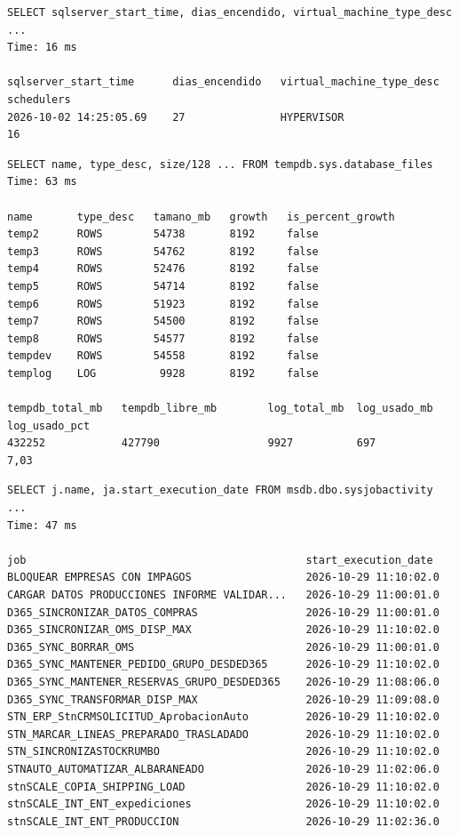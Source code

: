\documentclass[11pt,a4paper]{article}
\begin{document}
\begin{lstlisting}[style=salida]
SELECT sqlserver_start_time, dias_encendido, virtual_machine_type_desc ...
Time: 16 ms

sqlserver_start_time      dias_encendido   virtual_machine_type_desc   schedulers
2026-10-02 14:25:05.69    27               HYPERVISOR                  16
\end{lstlisting}

\begin{lstlisting}[style=salida]
SELECT name, type_desc, size/128 ... FROM tempdb.sys.database_files
Time: 63 ms

name       type_desc   tamano_mb   growth   is_percent_growth
temp2      ROWS        54738       8192     false
temp3      ROWS        54762       8192     false
temp4      ROWS        52476       8192     false
temp5      ROWS        54714       8192     false
temp6      ROWS        51923       8192     false
temp7      ROWS        54500       8192     false
temp8      ROWS        54577       8192     false
tempdev    ROWS        54558       8192     false
templog    LOG          9928       8192     false

tempdb_total_mb   tempdb_libre_mb        log_total_mb  log_usado_mb  log_usado_pct
432252            427790                 9927          697           7,03
\end{lstlisting}

\begin{lstlisting}[style=salida]
SELECT j.name, ja.start_execution_date FROM msdb.dbo.sysjobactivity ...
Time: 47 ms

job                                            start_execution_date
BLOQUEAR EMPRESAS CON IMPAGOS                  2026-10-29 11:10:02.0
CARGAR DATOS PRODUCCIONES INFORME VALIDAR...   2026-10-29 11:00:01.0
D365_SINCRONIZAR_DATOS_COMPRAS                 2026-10-29 11:00:01.0
D365_SINCRONIZAR_OMS_DISP_MAX                  2026-10-29 11:10:02.0
D365_SYNC_BORRAR_OMS                           2026-10-29 11:00:01.0
D365_SYNC_MANTENER_PEDIDO_GRUPO_DESDED365      2026-10-29 11:10:02.0
D365_SYNC_MANTENER_RESERVAS_GRUPO_DESDED365    2026-10-29 11:08:06.0
D365_SYNC_TRANSFORMAR_DISP_MAX                 2026-10-29 11:09:08.0
STN_ERP_StnCRMSOLICITUD_AprobacionAuto         2026-10-29 11:10:02.0
STN_MARCAR_LINEAS_PREPARADO_TRASLADADO         2026-10-29 11:10:02.0
STN_SINCRONIZASTOCKRUMBO                       2026-10-29 11:10:02.0
STNAUTO_AUTOMATIZAR_ALBARANEADO                2026-10-29 11:02:06.0
stnSCALE_COPIA_SHIPPING_LOAD                   2026-10-29 11:10:02.0
stnSCALE_INT_ENT_expediciones                  2026-10-29 11:10:02.0
stnSCALE_INT_ENT_PRODUCCION                    2026-10-29 11:02:36.0
\end{lstlisting}
\end{document}

